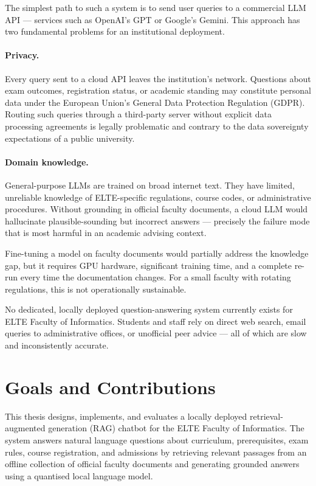 The simplest path to such a system is to send user queries to a commercial LLM API — services such as OpenAI's GPT or Google's Gemini. This approach has two fundamental problems for an institutional deployment.

\paragraph{Privacy.} Every query sent to a cloud API leaves the institution's network. Questions about exam outcomes, registration status, or academic standing may constitute personal data under the European Union's General Data Protection Regulation (GDPR). Routing such queries through a third-party server without explicit data processing agreements is legally problematic and contrary to the data sovereignty expectations of a public university.

\paragraph{Domain knowledge.} General-purpose LLMs are trained on broad internet text. They have limited, unreliable knowledge of ELTE-specific regulations, course codes, or administrative procedures. Without grounding in official faculty documents, a cloud LLM would hallucinate plausible-sounding but incorrect answers — precisely the failure mode that is most harmful in an academic advising context.

Fine-tuning a model on faculty documents would partially address the knowledge gap, but it requires GPU hardware, significant training time, and a complete re-run every time the documentation changes. For a small faculty with rotating regulations, this is not operationally sustainable.

No dedicated, locally deployed question-answering system currently exists for ELTE Faculty of Informatics. Students and staff rely on direct web search, email queries to administrative offices, or unofficial peer advice — all of which are slow and inconsistently accurate.

\section{Goals and Contributions}
\label{sec:intro-goals}

This thesis designs, implements, and evaluates a locally deployed retrieval-augmented generation (RAG) chatbot for the ELTE Faculty of Informatics. The system answers natural language questions about curriculum, prerequisites, exam rules, course registration, and admissions by retrieving relevant passages from an offline collection of official faculty documents and generating grounded answers using a quantised local language model.

